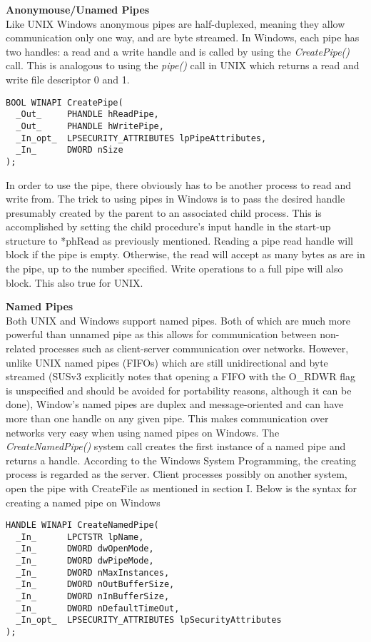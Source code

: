 \documentclass[11pt]{report}
\begin{document}
\textbf{\large Anonymouse/Unamed Pipes}\\
Like UNIX Windows anonymous pipes are half-duplexed, meaning they allow communication only one way, and are byte streamed. In Windows, each pipe has two handles: a read and a write handle and is called by using the \textit{CreatePipe()} call. This is analogous to using the \textit{pipe()} call in UNIX which returns a read and write file descriptor 0 and 1.

\begin{verbatim}
BOOL WINAPI CreatePipe(
  _Out_     PHANDLE hReadPipe,
  _Out_     PHANDLE hWritePipe,
  _In_opt_  LPSECURITY_ATTRIBUTES lpPipeAttributes,
  _In_      DWORD nSize
);
\end{verbatim}

In order to use the pipe, there obviously has to be another process to read and write from. The trick to using pipes in Windows is to pass the desired handle presumably created by the parent to an associated child process. This is accomplished by setting the child procedure’s input handle in the start-up structure to *phRead as previously mentioned. Reading a pipe read handle will block if the pipe is empty. Otherwise, the read will accept as many bytes as are in the pipe, up to the number specified. Write operations to a full pipe will also block. This also true for UNIX.

\textbf{\large Named Pipes}\\
Both UNIX and Windows support named pipes. Both of which are much more powerful than unnamed pipe as this allows for communication between non-related processes such as client-server communication over networks. However, unlike UNIX named pipes (FIFOs) which are still unidirectional and byte streamed (SUSv3 explicitly notes that opening a FIFO with the O\_RDWR flag is unspecified and should be avoided for portability reasons, although it can be done), Window’s named pipes are duplex and message-oriented and can have more than one handle on any given pipe. This makes communication over networks very easy when using named pipes on Windows. The \textit{CreateNamedPipe()} system call creates the first instance of a named pipe and returns a handle. According to the Windows System Programming, the creating process is regarded as the server. Client processes possibly on another system, open the pipe with CreateFile as mentioned in section I. Below is the syntax for creating a named pipe on Windows

\begin{verbatim}
HANDLE WINAPI CreateNamedPipe(
  _In_      LPCTSTR lpName,
  _In_      DWORD dwOpenMode,
  _In_      DWORD dwPipeMode,
  _In_      DWORD nMaxInstances,
  _In_      DWORD nOutBufferSize,
  _In_      DWORD nInBufferSize,
  _In_      DWORD nDefaultTimeOut,
  _In_opt_  LPSECURITY_ATTRIBUTES lpSecurityAttributes
);
\end{verbatim}
\end{document}

